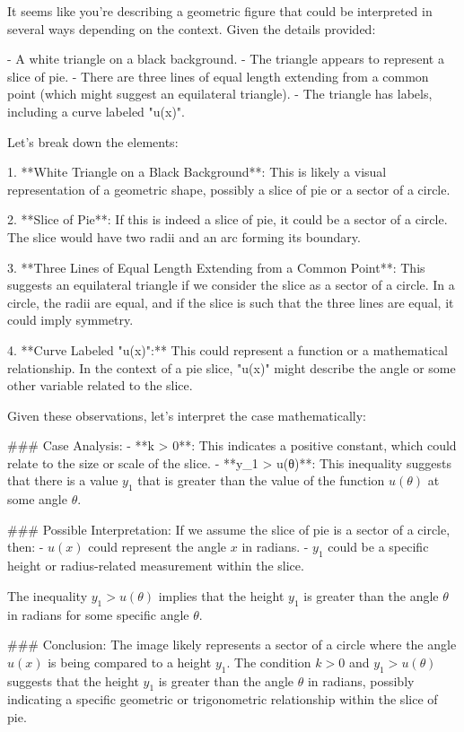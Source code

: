 It seems like you're describing a geometric figure that could be interpreted in several ways depending on the context. Given the details provided:

- A white triangle on a black background.
- The triangle appears to represent a slice of pie.
- There are three lines of equal length extending from a common point (which might suggest an equilateral triangle).
- The triangle has labels, including a curve labeled "u(x)".

Let's break down the elements:

1. **White Triangle on a Black Background**: This is likely a visual representation of a geometric shape, possibly a slice of pie or a sector of a circle.

2. **Slice of Pie**: If this is indeed a slice of pie, it could be a sector of a circle. The slice would have two radii and an arc forming its boundary.

3. **Three Lines of Equal Length Extending from a Common Point**: This suggests an equilateral triangle if we consider the slice as a sector of a circle. In a circle, the radii are equal, and if the slice is such that the three lines are equal, it could imply symmetry.

4. **Curve Labeled "u(x)":** This could represent a function or a mathematical relationship. In the context of a pie slice, "u(x)" might describe the angle or some other variable related to the slice.

Given these observations, let's interpret the case mathematically:

### Case Analysis:
- **k > 0**: This indicates a positive constant, which could relate to the size or scale of the slice.
- **y_1 > u(θ)**: This inequality suggests that there is a value \( y_1 \) that is greater than the value of the function \( u(\theta) \) at some angle \( \theta \).

### Possible Interpretation:
If we assume the slice of pie is a sector of a circle, then:
- \( u(x) \) could represent the angle \( x \) in radians.
- \( y_1 \) could be a specific height or radius-related measurement within the slice.

The inequality \( y_1 > u(\theta) \) implies that the height \( y_1 \) is greater than the angle \( \theta \) in radians for some specific angle \( \theta \).

### Conclusion:
The image likely represents a sector of a circle where the angle \( u(x) \) is being compared to a height \( y_1 \). The condition \( k > 0 \) and \( y_1 > u(\theta) \) suggests that the height \( y_1 \) is greater than the angle \( \theta \) in radians, possibly indicating a specific geometric or trigonometric relationship within the slice of pie.